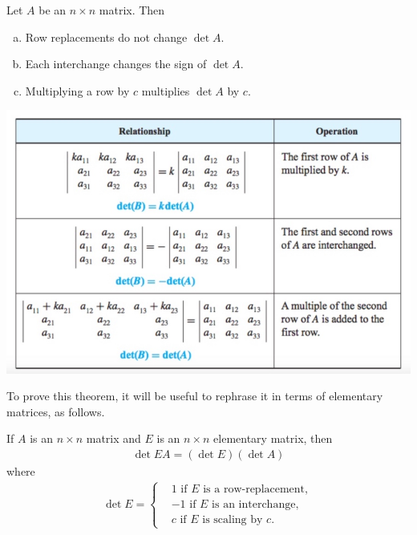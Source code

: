\documentclass[12pt,letterpaper,reqno]{article}
\numberwithin{equation}{section}
\begin{document}
\begin{thm}
	Let $A$ be an $n \times n$ matrix. Then
	\begin{enumerate}[(a)]
		\item Row replacements do not change $\det A$.
		\item Each interchange changes the sign of $\det A$.
		\item Multiplying a row by $c$ multiplies $\det A$ by $c$.
	\end{enumerate}
	\begin{center}
		\includegraphics[scale=0.4]{figures_mvc/ero_and_det}
	\end{center}
\end{thm}
To prove this theorem, it will be useful to rephrase it in terms of elementary matrices, as follows.
\begin{thm}\label{thm:elementary_matrices_and_determinants}
	If $A$ is an $n \times n$ matrix and $E$ is an $n \times n$ elementary matrix, then
	\begin{align*}
		\det EA=(\det E)(\det A)
	\end{align*}
	where
	\begin{align*}
		\det E=\begin{cases}
			&1 \text{ if $E$ is a row-replacement}, \\
			&-1 \text{ if $E$ is an interchange}, \\
			&c \text{ if $E$ is scaling by $c$}.
		\end{cases}
	\end{align*}
\end{thm}
\end{document}
